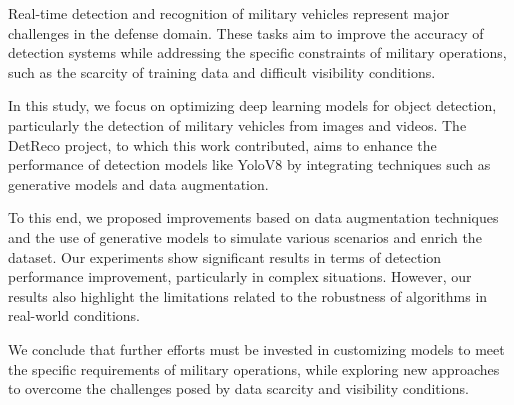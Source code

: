 \sloppy

Real-time detection and recognition of military vehicles represent major challenges in the defense domain. These tasks aim to improve the accuracy of detection systems while addressing the specific constraints of military operations, such as the scarcity of training data and difficult visibility conditions.

In this study, we focus on optimizing deep learning models for object detection, particularly the detection of military vehicles from images and videos. The DetReco project, to which this work contributed, aims to enhance the performance of detection models like YoloV8 by integrating techniques such as generative models and data augmentation.

To this end, we proposed improvements based on data augmentation techniques and the use of generative models to simulate various scenarios and enrich the dataset. Our experiments show significant results in terms of detection performance improvement, particularly in complex situations. However, our results also highlight the limitations related to the robustness of algorithms in real-world conditions.

We conclude that further efforts must be invested in customizing models to meet the specific requirements of military operations, while exploring new approaches to overcome the challenges posed by data scarcity and visibility conditions.
